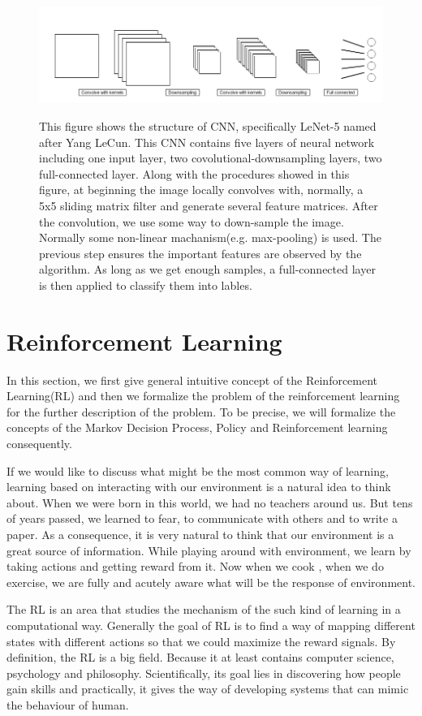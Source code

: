 \documentclass{article}
\begin{document}
\begin{figure}
\centering
{\includegraphics[width = 1\textwidth]{cnn}} 
\caption{This figure shows the structure of CNN, specifically LeNet-5 named after Yang LeCun. This CNN contains five layers of neural network including one input layer, two covolutional-downsampling layers, two full-connected layer. Along with the procedures showed in this figure, at beginning the image locally convolves with, normally, a 5x5 sliding matrix filter and generate several feature matrices. After the convolution, we use some way to down-sample the image. Normally some non-linear machanism(e.g. max-pooling) is used. The previous step ensures the important features are observed by the algorithm. As long as we get enough samples, a full-connected layer is then applied to classify them into lables.}\label{cnn}
\end{figure}


\section{Reinforcement Learning}
In this section, we first give general intuitive concept of the Reinforcement Learning(RL) and then we formalize the problem of the reinforcement learning for the further description of the problem. To be precise, we will formalize the concepts of the Markov Decision Process, Policy and Reinforcement learning consequently.

If we would like to discuss what might be the most common way of learning, learning based on interacting with our environment is a natural idea to think about. When we were born in this world, we had no teachers around us. But tens of years passed, we learned to fear, to communicate with others and to write a paper. As a consequence, it is very natural to think that our environment is a great source of information. While playing around with environment, we learn by taking actions and getting reward from it. Now when we cook , when we do exercise, we are fully and acutely aware what will be the response of environment. 

The RL is an area that studies the mechanism of the such kind of learning in a computational way. Generally the goal of RL is to find a way of mapping different states with different actions so that we could maximize the reward signals. By definition, the RL is a big field. Because it at least contains computer science, psychology and philosophy.  Scientifically, its goal lies in discovering how people gain skills and practically, it gives the way of developing systems that can mimic the behaviour of human.
\end{document}
